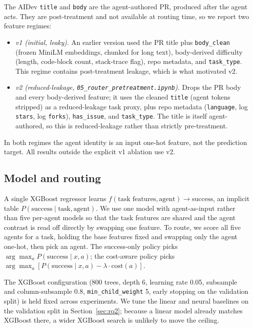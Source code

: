 \documentclass[sigconf,nonacm]{acmart}
\begin{document}
The AIDev \texttt{title} and \texttt{body} are the agent-authored PR, produced after the agent acts. They are post-treatment and not available at routing time, so we report two feature regimes:
\begin{itemize}
  \item \emph{v1 (initial, leaky).} An earlier version used the PR title plus \texttt{body\_clean} (frozen MiniLM embeddings, chunked for long text), body-derived difficulty (length, code-block count, stack-trace flag), repo metadata, and \texttt{task\_type}. This regime contains post-treatment leakage, which is what motivated v2.
  \item \emph{v2 (reduced-leakage, \texttt{05\_router\_pretreatment.ipynb}).} Drops the PR body and every body-derived feature; it uses the cleaned \texttt{title} (agent tokens stripped) as a reduced-leakage task proxy, plus repo metadata (\texttt{language}, log \texttt{stars}, log \texttt{forks}), \texttt{has\_issue}, and \texttt{task\_type}. The title is itself agent-authored, so this is reduced-leakage rather than strictly pre-treatment.
\end{itemize}
In both regimes the agent identity is an input one-hot feature, not the prediction target. All results outside the explicit v1 ablation use v2.

\subsection{Model and routing}\label{sec:model}

A single XGBoost regressor learns $f(\text{task features}, \text{agent}) \rightarrow \text{success}$, an implicit table $P(\text{success} \mid \text{task}, \text{agent})$. We use one model with agent-as-input rather than five per-agent models so that the task features are shared and the agent contrast is read off directly by swapping one feature. To route, we score all five agents for a task, holding the base features fixed and swapping only the agent one-hot, then pick an agent. The success-only policy picks $\arg\max_a P(\text{success} \mid x, a)$; the cost-aware policy picks $\arg\max_a [P(\text{success} \mid x, a) - \lambda \cdot \text{cost}(a)]$.

The XGBoost configuration (800 trees, depth 6, learning rate 0.05, subsample and column-subsample 0.8, \texttt{min\_child\_weight} 5, early stopping on the validation split) is held fixed across experiments. We tune the linear and neural baselines on the validation split in Section~\ref{sec:rq2}; because a linear model already matches XGBoost there, a wider XGBoost search is unlikely to move the ceiling.
\end{document}
